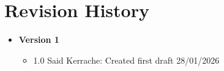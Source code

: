 \chapter*{Revision History}

\vfill
\begin{itemize}
	\item \textbf{Version 1}
		\begin{itemize}
			\item 1.0 Said Kerrache: Created first draft 28/01/2026
		\end{itemize}
\end{itemize}
\vfill